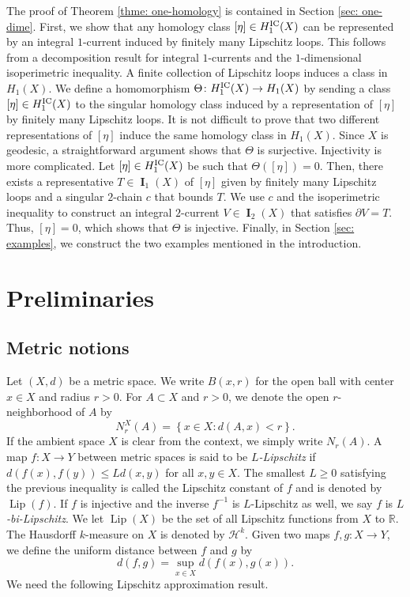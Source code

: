 \documentclass{amsart}
\numberwithin{equation}{section}
\newcommand{\R}{\mathbb{R}}
\newcommand{\Ha}{\mathcal{H}}
\newcommand{\Lip}{\operatorname{Lip}}
\DeclareMathOperator{\bI}{\mathbf{I}}
\begin{document}
    The proof of Theorem \ref{thme: one-homology} is contained in Section \ref{sec: one-dime}. First, we show that any homology class $[\eta] \in H_1^\textup{IC}(X)$ can be represented by an integral $1$-current induced by finitely many Lipschitz loops. This follows from a decomposition result for integral $1$-currents and the $1$-dimensional isoperimetric inequality. A finite collection of Lipschitz loops induces a class in $H_1(X)$. We define a homomorphism $\Theta \colon H_1^\textup{IC}(X) \to H_1(X)$ by sending a class $[\eta]\in H_1^\textup{IC}(X)$ to the singular homology class induced by a representation of $[\eta]$ by finitely many Lipschitz loops. It is not difficult to prove that two different representations of $[\eta]$ induce the same homology class in $H_1(X)$. Since $X$ is geodesic, a straightforward argument shows that $\Theta$ is surjective. Injectivity is more complicated. Let $[\eta] \in H_1^\textup{IC}(X)$ be such that $\Theta([\eta]) = 0$. Then, there exists a representative $T\in \bI_1(X) $ of $[\eta]$ given by finitely many Lipschitz loops and a singular $2$-chain $c$ that bounds $T$. We use $c$ and the isoperimetric inequality to construct an integral $2$-current $V \in \bI_2(X)$ that satisfies $\partial V = T$. Thus, $[\eta]  = 0$, which shows that $\Theta$ is injective. Finally, in Section \ref{sec: examples}, we construct the two examples mentioned in the introduction. 

\section{Preliminaries}\label{sec:prelis}
    \subsection{Metric notions}
        Let $(X,d)$ be a metric space. We write $B(x,r)$ for the open ball with center $x \in X$ and radius $r> 0$. For $A \subset X$ and $r>0$, we denote the open $r$-neighborhood of $A$ by 
        $$N_r^X(A) = \left\{x \in X \colon d(A,x) < r\right\}.$$
        If the ambient space $X$ is clear from the context, we simply write $N_r(A)$. A map $f\colon X \to Y$ between metric spaces is said to be \textit{\(L\)-Lipschitz} if $d(f(x),f(y)) \leq L d(x,y)$ for all $x,y \in X$. The smallest $L\geq 0$ satisfying the previous inequality is called the Lipschitz constant of $f$ and is denoted by $\Lip(f)$. If $f$ is injective and the inverse $f^{-1}$ is $L$-Lipschitz as well, we say $f$ is \textit{$L$-bi-Lipschitz}. We let $\Lip(X)$ be the set of all Lipschitz functions from $X$ to $\R$. The Hausdorff $k$-measure on $X$ is denoted by $\Ha^k$. Given two maps $f, g\colon X \to Y$, we define the uniform distance between \(f\) and \(g\) by
        $$ d(f, g)=\sup_{x\in X} d(f(x), g(x)).$$
        We need the following Lipschitz approximation result.
        
\end{document}

